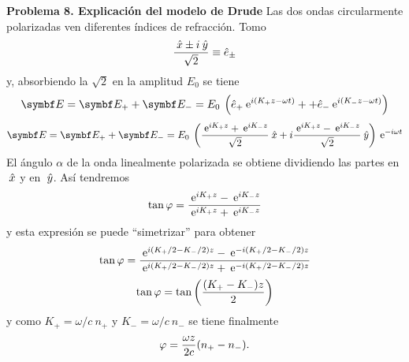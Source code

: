 \documentclass[10pt,oneside]{CBFT_book}
\begin{document}
\begin{ejemplo}{\bf Problema 8. Explicación del modelo de Drude}
Las dos ondas circularmente polarizadas ven diferentes índices de refracción.
Tomo
\[
	\frac{ \:\hat{x} \pm i \:\hat{y} }{\sqrt{2}} \equiv \hat{e}_{\pm}
\]
y, absorbiendo la $\sqrt{2}$ en la amplitud $E_0$ se tiene
\[
	\vb{E} = \vb{E}_+ + \vb{E}_- = 
	E_0 \: \left( \hat{e}_{+} \euler^{i (K_+z -\omega t)} +
	+ \hat{e}_{-} \euler^{i (K_-z -\omega t)} \right)
\]
\[
	\vb{E} = \vb{E}_+ + \vb{E}_- = 
	E_0 \: \left( \frac{ \euler^{i K_+ z } + \euler^{ i K_- z } }{\sqrt{2}}\xver +
	i \frac{ \euler^{i K_+ z} - \euler^{i K_- z }}{\sqrt{2}} \yver \right) 
	\euler^{ -i \omega t }
\]
El ángulo $\alpha$ de la onda linealmente polarizada se obtiene dividiendo las partes
en $\:\hat{x}$ y en $\:\hat{y}$.
Así tendremos
\[
	\tan\varphi = \frac{\:\mathrm{e}^{i K_+ z} - \:\mathrm{e}^{i K_- z }}{\:\mathrm{e}^{i K_+ z} + \:\mathrm{e}^{i K_- z }}
\]
y esta expresión se puede ``simetrizar'' para obtener
\[
	\tan\varphi = \frac{\:\mathrm{e}^{i ( K_+/2 - K_-/2 ) z} - \:\mathrm{e}^{- i ( K_+/2 - K_-/2 ) z }}
	{ \:\mathrm{e}^{i  ( K_+/2 - K_-/2 )  z} + \:\mathrm{e}^{-i ( K_+/2 - K_-/2 ) z } }
\]
\[
	\tan \varphi = \tan\left( \frac{ (K_+ - K_-)z }{ 2 } \right)
\]
y como $K_+ =\omega/c \: n_+$ y $K_- =\omega/c \: n_-$ se tiene finalmente
\[
	\varphi = \frac{\omega z}{2c}( n_+ - n_- ).
\]
  
\end{ejemplo}
\end{document}
